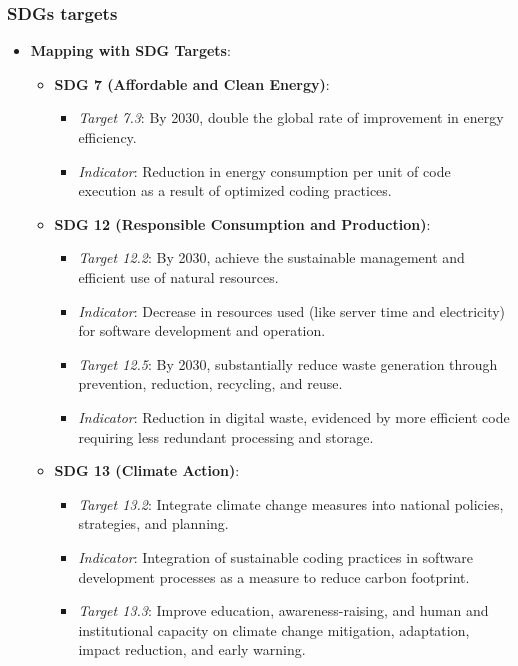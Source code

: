 \documentclass[conference,compsoc]{IEEEtran}
\begin{document}
\subsubsection{SDGs targets}
\begin{itemize}
	\item \textbf{Mapping with SDG Targets}:
	      \begin{itemize}
		      \item \textbf{SDG 7 (Affordable and Clean Energy)}:
		            \begin{itemize}
			            \item \textit{Target 7.3}: By 2030, double the global rate of improvement in energy efficiency.
			            \item \textit{Indicator}: Reduction in energy consumption per unit of code execution as a result of optimized coding practices.
		            \end{itemize}
		      \item \textbf{SDG 12 (Responsible Consumption and Production)}:
		            \begin{itemize}
			            \item \textit{Target 12.2}: By 2030, achieve the sustainable management and efficient use of natural resources.
			            \item \textit{Indicator}: Decrease in resources used (like server time and electricity) for software development and operation.
			            \item \textit{Target 12.5}: By 2030, substantially reduce waste generation through prevention, reduction, recycling, and reuse.
			            \item \textit{Indicator}: Reduction in digital waste, evidenced by more efficient code requiring less redundant processing and storage.
		            \end{itemize}
		      \item \textbf{SDG 13 (Climate Action)}:
		            \begin{itemize}
			            \item \textit{Target 13.2}: Integrate climate change measures into national policies, strategies, and planning.
			            \item \textit{Indicator}: Integration of sustainable coding practices in software development processes as a measure to reduce carbon footprint.
			            \item \textit{Target 13.3}: Improve education, awareness-raising, and human and institutional capacity on climate change mitigation, adaptation, impact reduction, and early warning.

\end{itemize}
\end{itemize}
\end{itemize}
\end{document}
